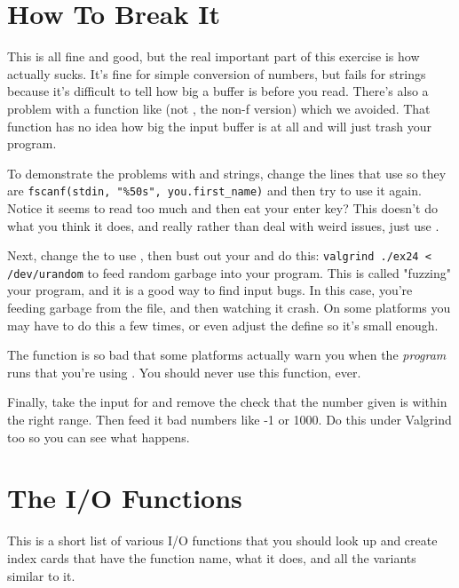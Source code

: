 \section{How To Break It}

This is all fine and good, but the real important part of this exercise is
how  actually sucks.  It's fine for simple conversion of numbers,
but fails for strings because it's difficult to tell  how big a buffer
is before you read.  There's also a problem with a function like 
(not , the non-f version) which we avoided.  That function has
no idea how big the input buffer is at all and will just trash your program.

To demonstrate the problems with  and strings, change the lines
that use  so they are \verb|fscanf(stdin, "%50s", you.first_name)|
and then try to use it again.  Notice it seems to read too much and then 
eat your enter key?  This doesn't do what you think it does, and really
rather than deal with weird  issues, just use .

Next, change the  to use , then bust out your
 and do this:  \verb|valgrind ./ex24 < /dev/urandom|
to feed random garbage into your program.  This is called "fuzzing"
your program, and it is a good way to find input bugs.  In this case,
you're feeding garbage from the  file, and then watching
it crash.  On some platforms you may have to do this a few times, or even
adjust the  define so it's small enough.

The  function is so bad that some platforms actually warn you
when the \emph{program} runs that you're using .  You should
never use this function, ever.

Finally, take the input for  and remove the check that the
number given is within the right range.  Then feed it bad numbers like -1 or
1000.  Do this under Valgrind too so you can see what happens.

\section{The I/O Functions}

This is a short list of various I/O functions that you should look up and
create index cards that have the function name, what it does, and all the
variants similar to it.

